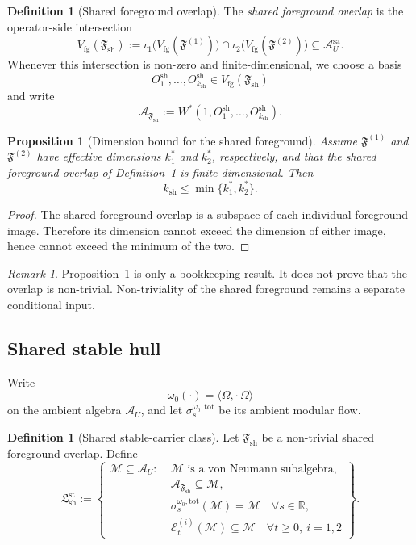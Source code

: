 \documentclass[12pt]{article}
\newtheorem{proposition}[theorem]{Proposition}
\theoremstyle{definition}
\newtheorem{definition}[theorem]{Definition}
\theoremstyle{remark}
\newtheorem{remark}[theorem]{Remark}
\begin{document}
\begin{definition}[Shared foreground overlap]
\label{def:sharedfg}
The \emph{shared foreground overlap} is the operator-side intersection
\[
V_{\mathrm{fg}}(\mathfrak F_{\mathrm{sh}})
:=
\iota_1\bigl(V_{\mathrm{fg}}(\mathfrak F^{(1)})\bigr)
\cap
\iota_2\bigl(V_{\mathrm{fg}}(\mathfrak F^{(2)})\bigr)
\subseteq
\mathcal A_U^{\mathrm{sa}}.
\]
Whenever this intersection is non-zero and finite-dimensional, we choose
a basis
\[
O_1^{\mathrm{sh}},\dots,O_{k_{\mathrm{sh}}}^{\mathrm{sh}}
\in
V_{\mathrm{fg}}(\mathfrak F_{\mathrm{sh}})
\]
and write
\[
\mathcal A_{\mathfrak F_{\mathrm{sh}}}
:=
W^*(1,O_1^{\mathrm{sh}},\dots,O_{k_{\mathrm{sh}}}^{\mathrm{sh}}).
\]
\end{definition}

\begin{proposition}[Dimension bound for the shared foreground]
\label{prop:sharedfgdim}
Assume \(\mathfrak F^{(1)}\) and \(\mathfrak F^{(2)}\) have effective
dimensions \(k_1^*\) and \(k_2^*\), respectively, and that the shared
foreground overlap of Definition~\ref{def:sharedfg} is finite
dimensional. Then
\[
k_{\mathrm{sh}}
\le
\min\{k_1^*,k_2^*\}.
\]
\end{proposition}

\begin{proof}
The shared foreground overlap is a subspace of each individual
foreground image. Therefore its dimension cannot exceed the dimension of
either image, hence cannot exceed the minimum of the two.
\end{proof}

\begin{remark}
Proposition~\ref{prop:sharedfgdim} is only a bookkeeping result. It
does not prove that the overlap is non-trivial. Non-triviality of the
shared foreground remains a separate conditional input.
\end{remark}

\subsection{Shared stable hull}

Write
\[
\omega_0(\cdot)=\langle\Omega,\cdot\,\Omega\rangle
\]
on the ambient algebra \(\mathcal A_U\), and let
\(\sigma_s^{\omega_0,\mathrm{tot}}\) be its ambient modular flow.

\begin{definition}[Shared stable-carrier class]
\label{def:sharedcarrier}
Let \(\mathfrak F_{\mathrm{sh}}\) be a non-trivial shared foreground
overlap. Define
\[
\mathfrak L_{\mathrm{sh}}^{\mathrm{st}}
:=
\left\{
\begin{aligned}
\mathcal M\subseteq\mathcal A_U:\;&
\mathcal M \text{ is a von Neumann subalgebra},\\
&
\mathcal A_{\mathfrak F_{\mathrm{sh}}}\subseteq \mathcal M,\\
&
\sigma_s^{\omega_0,\mathrm{tot}}(\mathcal M)=\mathcal M
\quad \forall s\in\mathbb R,\\
&
\mathcal E_t^{(i)}(\mathcal M)\subseteq \mathcal M
\quad \forall t\ge 0,\ i=1,2
\end{aligned}
\right\}.
\]
\end{definition}
\end{document}
